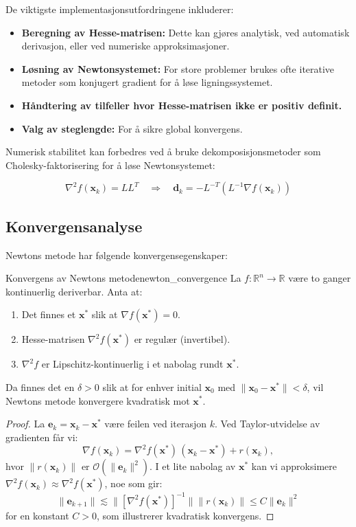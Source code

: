 De viktigste implementasjonsutfordringene inkluderer:

\begin{itemize}
	\item \textbf{Beregning av Hesse-matrisen:} Dette kan gjøres analytisk, ved automatisk derivasjon, eller ved numeriske approksimasjoner.
	\item \textbf{Løsning av Newtonsystemet:} For store problemer brukes ofte iterative metoder som konjugert gradient for å løse ligningssystemet.
	\item \textbf{Håndtering av tilfeller hvor Hesse-matrisen ikke er positiv definit.}
	\item \textbf{Valg av steglengde:} For å sikre global konvergens.
\end{itemize}

Numerisk stabilitet kan forbedres ved å bruke dekomposisjonsmetoder som Cholesky-faktorisering for å løse Newtonsystemet:

\[
	\nabla^2 f(\symbf{x}_k) = LL^T \quad \Rightarrow \quad \symbf{d}_k = -L^{-T}(L^{-1}\nabla f(\symbf{x}_k))
\]

\subsection{Konvergensanalyse}
\label{subsec:newton_convergence}

Newtons metode har følgende konvergensegenskaper:

\begin{theorem}{Konvergens av Newtons metode}{newton_convergence}
	La \( f : \mathbb{R}^n \to \mathbb{R} \) være to ganger kontinuerlig deriverbar. Anta at:
	\begin{enumerate}
		\item Det finnes et \(\symbf{x}^\ast\) slik at \(\nabla f(\symbf{x}^\ast) = 0\).
		\item Hesse-matrisen \(\nabla^2 f(\symbf{x}^\ast)\) er regulær (invertibel).
		\item \(\nabla^2 f\) er Lipschitz-kontinuerlig i et nabolag rundt \(\symbf{x}^\ast\).
	\end{enumerate}
	Da finnes det en \(\delta > 0\) slik at for enhver initial \(\symbf{x}_0\) med \(\|\symbf{x}_0 - \symbf{x}^\ast\| < \delta\), vil Newtons metode konvergere kvadratisk mot \(\symbf{x}^\ast\).
\end{theorem}

\begin{proof}
	La \(\symbf{e}_k = \symbf{x}_k - \symbf{x}^\ast\) være feilen ved iterasjon \(k\).
	Ved Taylor-utvidelse av gradienten får vi:
	\[
		\nabla f(\symbf{x}_k)
		= \nabla^2 f(\symbf{x}^\ast)\,(\symbf{x}_k - \symbf{x}^\ast) + r(\symbf{x}_k),
	\]
	hvor \(\|r(\symbf{x}_k)\|\) er \(\mathcal{O}(\|\symbf{e}_k\|^2)\). I et lite nabolag av \(\symbf{x}^\ast\) kan vi approksimere \(\nabla^2 f(\symbf{x}_k)\approx \nabla^2 f(\symbf{x}^\ast)\), noe som gir:
	\[
		\|\symbf{e}_{k+1}\| \lesssim \|[\nabla^2 f(\symbf{x}^\ast)]^{-1}\| \|r(\symbf{x}_k)\| \le C \|\symbf{e}_k\|^2
	\]
	for en konstant \(C>0\), som illustrerer kvadratisk konvergens.
\end{proof}

